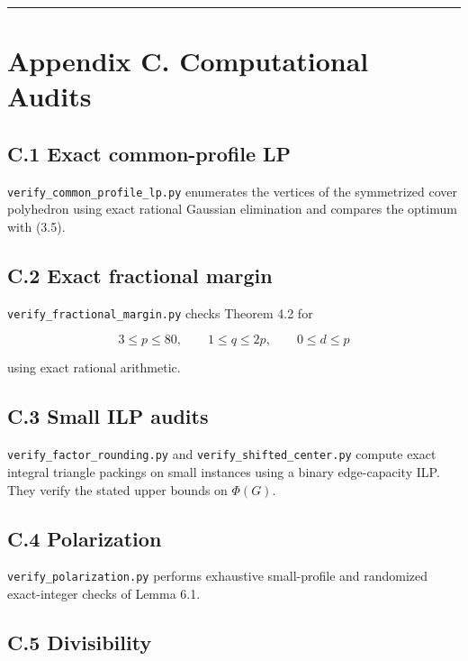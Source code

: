 \documentclass[
  11pt,
]{article}
\begin{document}
\begin{center}\rule{0.5\linewidth}{0.5pt}\end{center}

\section{Appendix C. Computational
Audits}\label{appendix-c.-computational-audits}

\subsection{C.1 Exact common-profile
LP}\label{c.1-exact-common-profile-lp}

\texttt{verify\_common\_profile\_lp.py} enumerates the vertices of the
symmetrized cover polyhedron using exact rational Gaussian elimination
and compares the optimum with (3.5).

\subsection{C.2 Exact fractional
margin}\label{c.2-exact-fractional-margin}

\texttt{verify\_fractional\_margin.py} checks Theorem 4.2 for

\[
3\le p\le80,
\qquad
1\le q\le2p,
\qquad
0\le d\le p
\]

using exact rational arithmetic.

\subsection{C.3 Small ILP audits}\label{c.3-small-ilp-audits}

\texttt{verify\_factor\_rounding.py} and
\texttt{verify\_shifted\_center.py} compute exact integral triangle
packings on small instances using a binary edge-capacity ILP. They
verify the stated upper bounds on \(\Phi(G)\).

\subsection{C.4 Polarization}\label{c.4-polarization}

\texttt{verify\_polarization.py} performs exhaustive small-profile and
randomized exact-integer checks of Lemma 6.1.

\subsection{C.5 Divisibility}\label{c.5-divisibility}
\end{document}

